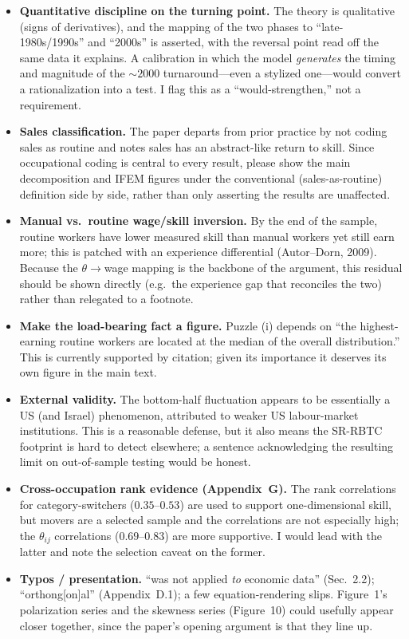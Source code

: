 \documentclass[11pt]{article}
\begin{document}
\begin{itemize}
\item \textbf{Quantitative discipline on the turning point.} The theory is qualitative (signs of
derivatives), and the mapping of the two phases to ``late-1980s/1990s'' and ``2000s'' is asserted,
with the reversal point read off the same data it explains. A calibration in which the model
\emph{generates} the timing and magnitude of the $\sim\!2000$ turnaround---even a stylized one---would
convert a rationalization into a test. I flag this as a ``would-strengthen,'' not a requirement.
\item \textbf{Sales classification.} The paper departs from prior practice by not coding sales as
routine and notes sales has an abstract-like return to skill. Since occupational coding is central to
every result, please show the main decomposition and IFEM figures under the conventional
(sales-as-routine) definition side by side, rather than only asserting the results are unaffected.
\item \textbf{Manual vs.\ routine wage/skill inversion.} By the end of the sample, routine workers
have lower measured skill than manual workers yet still earn more; this is patched with an experience
differential (Autor--Dorn, 2009). Because the $\theta\!\to\!$wage mapping is the backbone of the
argument, this residual should be shown directly (e.g.\ the experience gap that reconciles the two)
rather than relegated to a footnote.
\item \textbf{Make the load-bearing fact a figure.} Puzzle (i) depends on ``the highest-earning
routine workers are located at the median of the overall distribution.'' This is currently supported
by citation; given its importance it deserves its own figure in the main text.
\item \textbf{External validity.} The bottom-half fluctuation appears to be essentially a US (and
Israel) phenomenon, attributed to weaker US labour-market institutions. This is a reasonable defense,
but it also means the SR-RBTC footprint is hard to detect elsewhere; a sentence acknowledging the
resulting limit on out-of-sample testing would be honest.
\item \textbf{Cross-occupation rank evidence (Appendix~G).} The rank correlations for
category-switchers ($0.35$--$0.53$) are used to support one-dimensional skill, but movers are a
selected sample and the correlations are not especially high; the $\theta_{ij}$ correlations
($0.69$--$0.83$) are more supportive. I would lead with the latter and note the selection caveat on
the former.
\item \textbf{Typos / presentation.} ``was not applied \emph{to} economic data'' (Sec.~2.2);
``orthong[on]al'' (Appendix~D.1); a few equation-rendering slips. Figure~1's polarization series and
the skewness series (Figure~10) could usefully appear closer together, since the paper's opening
argument is that they line up.
\end{itemize}
\end{document}
